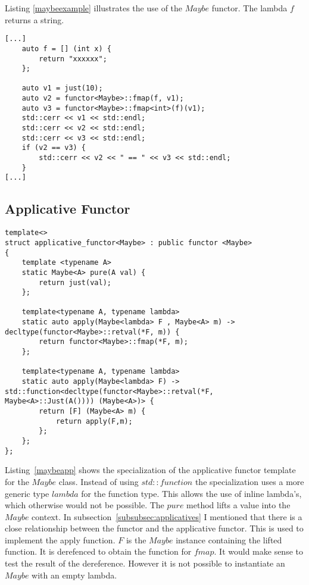 \documentclass[12pt,fleqn]{article}
\begin{document}
Listing \ref{maybeexample} illustrates the use of the $Maybe$ functor.
The lambda $f$ returns a string.

%
%
\begin{minipage}{\linewidth}
\begin{lstlisting}[caption=example of the maybe functor, label=maybefunctorexample]
[...]
	auto f = [] (int x) {
		return "xxxxxx";
	};

	auto v1 = just(10);
	auto v2 = functor<Maybe>::fmap(f, v1);
	auto v3 = functor<Maybe>::fmap<int>(f)(v1);
	std::cerr << v1 << std::endl;
	std::cerr << v2 << std::endl;
	std::cerr << v3 << std::endl;
	if (v2 == v3) {
		std::cerr << v2 << " == " << v3 << std::endl;
	}
[...]
\end{lstlisting}
\end{minipage}
%
%
%

%
\subsection{Applicative Functor}
%


%
%
\begin{minipage}{\linewidth}
\begin{lstlisting}[caption=Maybe applicative functor, label=maybeapp ]
template<>
struct applicative_functor<Maybe> : public functor <Maybe>
{
	template <typename A> 
	static Maybe<A> pure(A val) {
		return just(val);
	};
	
	template<typename A, typename lambda>
	static auto apply(Maybe<lambda> F , Maybe<A> m) -> decltype(functor<Maybe>::retval(*F, m)) { 
		return functor<Maybe>::fmap(*F, m);
	};

	template<typename A, typename lambda>
	static auto apply(Maybe<lambda> F) -> std::function<decltype(functor<Maybe>::retval(*F, Maybe<A>::Just(A()))) (Maybe<A>)> {
		return [F] (Maybe<A> m) {
			return apply(F,m);
		};
	};
};
\end{lstlisting}
\end{minipage}
%
%
%
%
Listing~\ref{maybeapp} shows the specialization of the applicative functor template for the $Maybe$ class.
Instead of using $std::function$ the specialization uses a more generic type $lambda$ for the function type.
This allows the use of inline lambda's, which otherwise would not be possible.
The $pure$ method lifts a value into the $Maybe$ context.
In subsection~\ref{subsubsec:applicatives} I mentioned that there is a close relationship between the functor and the applicative functor.
This is used to implement the apply function. $F$ is the $Maybe$ instance containing the lifted function. 
It is derefenced to obtain the function for $fmap$.
It would make sense to test the result of the dereference. However it is not possible to instantiate an $Maybe$ with an empty lambda. 
\end{document}
